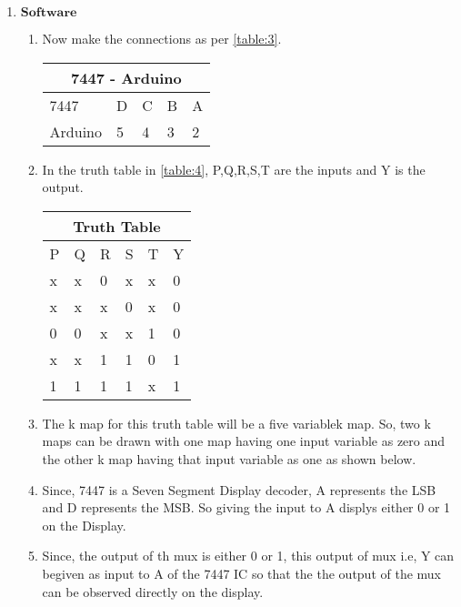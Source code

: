 \documentclass{article}
\begin{document}
\begin{enumerate}
\begin{enumerate}
		\end{enumerate}
	\item $\textbf{Software}$
		\begin{enumerate}
			\item Now make the connections as per \ref{table:3}.
				\label{table:3}\begin{tabular}{|p{3cm}|p{1cm}|p{1cm}|p{1cm}|p{1cm}|}
					\hline
					\multicolumn{5}{|c|}{7447 - Arduino}\\
					\hline
					7447& D& C& B& A\\
					\hline
					Arduino& 5& 4& 3& 2\\
					\hline
				\end{tabular}
			\item In the truth table in \ref{table:4}, P,Q,R,S,T are the inputs and Y is the output.
				\label{table:4}\begin{tabular}{|p{1cm}|p{1cm}|p{1cm}|p{1cm}|p{1cm}|p{1cm}|}
					\hline
					\multicolumn{6}{|c|}{Truth Table}\\
					\hline
					P& Q& R& S& T& Y\\
					\hline
					x& x& 0& x& x& 0\\
					\hline
					x& x& x& 0& x& 0\\
					\hline
					0& 0& x& x& 1& 0\\
					\hline
					x& x& 1& 1& 0& 1\\
					\hline
					1& 1& 1& 1& x& 1\\
					\hline
				\end{tabular}
			\item The k map for this truth table will be a five variablek map. So, two k maps can be drawn with one map having one input variable as zero and the other k map having that input variable as one as shown below.
				\begin{karnaugh-map}[4][4][2][$T$][$S$][$R$][$Q$][$P$]
					\autoterms[0]
				\end{karnaugh-map}
		\item Since, 7447 is a Seven Segment Display decoder, A represents the LSB and D represents the MSB. So giving the input to A displys either 0 or 1 on the Display.
			\item Since, the output of th mux is either 0 or 1, this output of mux i.e, Y can begiven as input to A of the 7447 IC so that the the output of the mux can be observed directly on the display.

\end{enumerate}
\end{enumerate}
\end{document}
